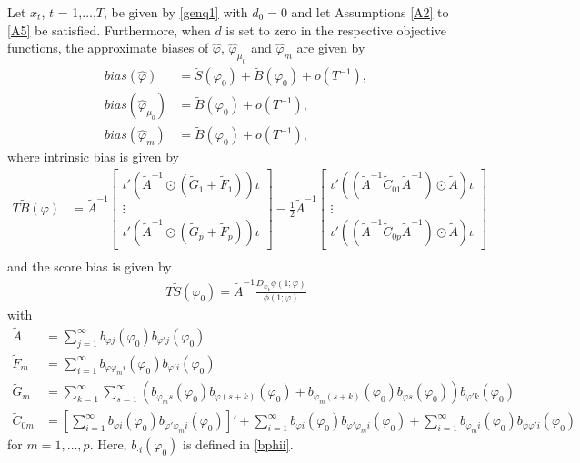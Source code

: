 {{\begin{theorem}\label{t55} 
Let $x_t$, $t$ = 1,$\ldots$,$T$, be given by \eqref{genq1} with $d_0 = 0$ and let Assumptions \ref{A2} to \ref{A5} be satisfied. Furthermore, when $d$ is set to zero in the respective objective functions, the approximate biases of $\hat{\varphi}$, $\hat{\varphi}_{\mu_0}$ and $\hat{\varphi}_{m}$ are given by 
\begin{align}
    bias(\hat{\varphi}) &= \tilde{S}(\varphi_0) + \tilde{B}(\varphi_0) + o(T^{-1}), \\
    bias(\hat{\varphi}_{\mu_0}) &= \tilde{B}(\varphi_0)  + o(T^{-1}), \\
    bias(\hat{\varphi}_{m}) &=  \tilde{B}(\varphi_0)  + o(T^{-1}),
\end{align}
where intrinsic bias is given by
\begin{align*}
    T \tilde{B}(\varphi) &=   \tilde{A}^{-1}   \begin{bmatrix}
\iota' \left( \tilde{A}^{-1} \odot \left(\tilde{G}_1 + \tilde{F}_1 \right) \right)\iota \\
\vdots    \\
\iota' \left( \tilde{A}^{-1} \odot \left(\tilde{G}_p + \tilde{F}_p \right) \right)\iota 
\end{bmatrix} - \frac{1}{2} \tilde{A}^{-1} \begin{bmatrix}
\iota' \left(\left(\tilde{A}^{-1} \tilde{C}_{01} \tilde{A}^{-1} \right) \odot \tilde{A} \right) \iota \\
\vdots    \\
\iota' \left(\left(\tilde{A}^{-1} \tilde{C}_{0p} \tilde{A}^{-1} \right) \odot \tilde{A} \right) \iota
\end{bmatrix} \\
\end{align*}
and the score bias is given by  
\begin{align*}
    T\tilde{S}(\varphi_0) = \tilde{A}^{-1} \frac{ D_{\varphi_{k}}\phi(1;\varphi)  }{ \phi(1;\varphi) } 
\end{align*}
with 
\begin{align*}
    \tilde{A} &= \sum_{j = 1}^{\infty} b_{\varphi j}(\varphi_0) b_{\varphi' j}(\varphi_0) \\
    \tilde{F}_m &= \sum_{i = 1}^{\infty}  b_{\varphi \varphi_m i}(\varphi_0) b_{\varphi' i}(\varphi_0) \\
    \tilde{G}_m &= \sum_{k = 1}^{\infty}  \sum_{s = 1}^{\infty} \left(  b_{\varphi_m s}(\varphi_0) b_{\varphi (s+k)}(\varphi_0) + b_{\varphi_m (s+k)}(\varphi_0) b_{\varphi s}(\varphi_0) \right)  b_{\varphi' k}(\varphi_0)\\
    \tilde{C}_{0m} &= \left[ \sum_{i = 1}^{\infty}  b_{\varphi i}(\varphi_0) b_{\varphi' \varphi_m i}(\varphi_0) \right]' + \sum_{i = 1}^{\infty}  b_{\varphi  i}(\varphi_0) b_{\varphi' \varphi_m i}(\varphi_0)  + \sum_{i = 1}^{\infty}  b_{\varphi_m i}(\varphi_0) b_{\varphi \varphi' i}(\varphi_0)
\end{align*}
for $m = 1,\ldots,p$. Here, $b_{\cdot i}(\varphi_0)$ is defined in \eqref{bphii}. 
\end{theorem}


}}
